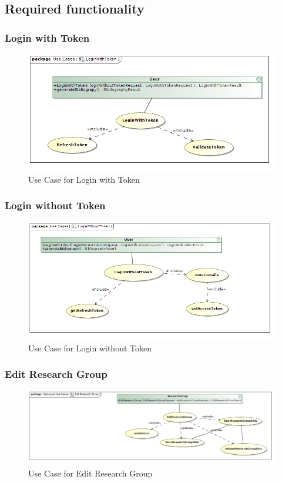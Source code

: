 \documentclass[a4paper,10pt]{article}
\begin{document}
\subsection{Required functionality}

\subsubsection{Login with Token}
	\begin{figure}[H]
		\includegraphics[scale=0.5]{LoginWithTokenUse}
	\caption{Use Case for Login with Token}
	\end{figure}

\subsubsection{Login without Token}
	\begin{figure}[H]
		\includegraphics[scale=0.5]{LoginWithoutTokenUse}
	\caption{Use Case for Login without Token}
	\end{figure}

\subsubsection{Edit Research Group}
	\begin{figure}[H]
		\includegraphics[scale=0.5]{UseEditResearchGroup}
	\caption{Use Case for Edit Research Group}
	\end{figure}
	
\end{document}
